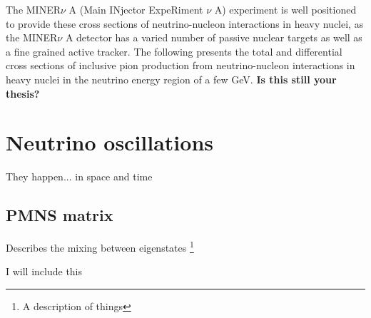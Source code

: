 \documentclass[../main.tex]{subfiles}
\begin{document}
The MINER$\nu$ A (Main INjector ExpeRiment $\nu$ A) experiment is well positioned to provide these cross sections of neutrino-nucleon interactions in heavy nuclei, as the MINER$\nu$ A detector has a varied number of passive nuclear targets as well as a fine grained active tracker.  The following presents the total and differential cross sections of inclusive pion production from neutrino-nucleon interactions in heavy nuclei in the neutrino energy region of a few GeV. \textbf{Is this still your thesis?}
\section{Neutrino oscillations}
They happen... in space and time

\subsection{PMNS matrix}
Describes the mixing between eigenstates \footnote{A description of
things}

I will include this\cite{lamport94}

%
\end{document}
